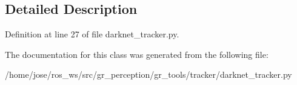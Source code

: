 \subsection{Detailed Description}


Definition at line 27 of file darknet\+\_\+tracker.\+py.



The documentation for this class was generated from the following file\+:\begin{DoxyCompactItemize}
\item 
/home/jose/ros\+\_\+ws/src/gr\+\_\+perception/gr\+\_\+tools/tracker/darknet\+\_\+tracker.\+py\end{DoxyCompactItemize}
